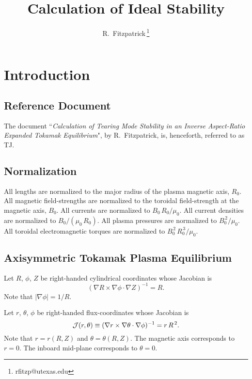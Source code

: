 \documentclass[12pt,prb,aps,notitlepage]{revtex4-1}
\begin{document}
\title{Calculation of Ideal Stability}
\author{R.~Fitzpatrick\,\footnote{rfitzp@utexas.edu}}
\begin{abstract}
\end{abstract}
\maketitle

\section{Introduction}
\subsection{Reference Document}
The document ``{\em Calculation of Tearing Mode Stability in an Inverse Aspect-Ratio Expanded Tokamak Equilibrium}", by R.~Fitzpatrick,  is, henceforth,
referred to as TJ. 

\subsection{Normalization}\label{coords}
All lengths are normalized to  the major radius of the plasma magnetic axis, $R_0$. All magnetic field-strengths
are normalized to the  toroidal field-strength at the magnetic axis, $B_0$. All currents are normalized to $B_0\,R_0/\mu_0$. All current densities are normalized to $B_0/(\mu_0\,R_0)$.  All plasma pressures are normalized to $B_0^{\,2}/\mu_0$.
All toroidal electromagnetic torques are normalized to $B_0^{\,2}\,R_0^{\,3}/\mu_0$. 

\subsection{Axisymmetric Tokamak Plasma Equilibrium}\label{s3}
Let $R$, $\phi$, $Z$ be right-handed cylindrical coordinates whose Jacobian 
is
\begin{equation}
(\nabla R\times \nabla\phi\cdot\nabla Z)^{-1} = R.
\end{equation}
Note that $|\nabla\phi|=1/R$. 

Let $r$, $\theta$, $\phi$ be right-handed flux-coordinates whose
Jacobian is
\begin{equation}\label{jac}
{\cal J}(r,\theta)\equiv (\nabla r\times \nabla\theta\cdot\nabla\phi)^{-1}= r\,R^{\,2}.
\end{equation}
Note that $r=r(R,Z)$ and $\theta=\theta(R,Z)$. 
The magnetic axis corresponds to $r=0$. The inboard mid-plane corresponds to $\theta=0$. 
\end{document}
